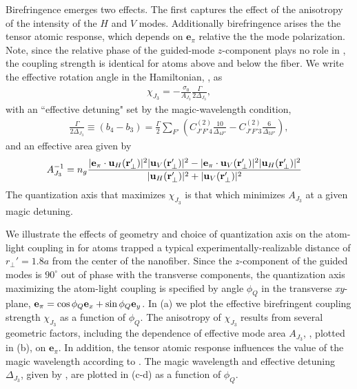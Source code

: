 \documentclass[preprint,aps,pra,onecolumn]{revtex4-1} %
\newcommand{\qaxis}{\mathbf{e}_\pi}
\begin{document}
Birefringence emerges two effects.  The first captures the effect of the anisotropy of the intensity of the $H$ and $V$ modes.  Additionally birefringence arises the the tensor atomic response, which depends on $\mathbf{e}_\pi$ relative the the mode polarization. Note,  since the relative phase of the guided-mode $z$-component plays no role in , the coupling strength is identical for atoms above and below the fiber.  We write the effective rotation angle in the Hamiltonian, , as
	\begin{align} \label{Eq::chieff}
		\chi_{J_3} = - \frac{\sigma_0}{A_{J_3}} \frac{\Gamma}{ 2 \Delta_{J_3}},
	\end{align}
with an ``effective detuning" set by the magic-wavelength condition,
	\begin{align} \label{Eq::SqueezingEffectiveDetuning}
		\frac{\Gamma}{2 \Delta_{J_3}} \equiv (b_4 - b_3) =  \frac{\Gamma}{2} \sum_{F'}  \left( C^{(2)}_{J'F'4}\frac{10}{\Delta_{4F'}} -  C^{(2)}_{J'F'3}\frac{6}{ \Delta_{3F'} } \right),
	\end{align}
and an effective area given by
	\begin{align} \label{Eq::SqueezingModeArea}
		A_{J_3}^{-1} & = n_g \frac{ |\mathbf{e}_\pi \cdot \mathbf{u}_H(\mathbf{r}'_\perp) |^2 |\mathbf{u}_V(\mathbf{r}'_\perp)|^2 - |\mathbf{e}_\pi \cdot \mathbf{u}_V(\mathbf{r}'_\perp)|^2 |\mathbf{u}_H(\mathbf{r}'_\perp)|^2}{ |\mathbf{u}_H(\mathbf{r}'_\perp)|^2 + |\mathbf{u}_V(\mathbf{r}'_\perp)|^2 } 
	\end{align}	
The quantization axis that maximizes $\chi_{J_3}$ is that which minimizes $A_{J_3}$ at a given magic detuning.  

We illustrate the effects of geometry and choice of quantization axis on the atom-light coupling in   for atoms trapped a typical experimentally-realizable \cite{} distance of $r_\perp'=1.8a$ from the center of the nanofiber. Since the $z$-component of the guided modes is $90^\circ$ out of phase with the transverse components, the quantization axis maximizing the atom-light coupling is specified by angle $\phi_Q$ in the transverse \emph{xy}-plane, $\qaxis = \cos \phi_Q \mbf{e}_x + \sin \phi_Q \mbf{e}_y$. In (a) we plot the effective birefringent coupling strength $\chi_{J_3}$ as a function of $\phi_Q$. The anisotropy of $\chi_{J_3}$ results from several geometric factors, including the dependence of effective mode area $A_{J_3}$, , plotted in (b), on $\mathbf{e}_\pi$. In addition, the tensor atomic response influences the value of the magic wavelength according to . The magic wavelength and effective detuning $\Delta_{J_3}$, given by , are plotted in (c-d) as a function of $\phi_Q$.  
\end{document}
